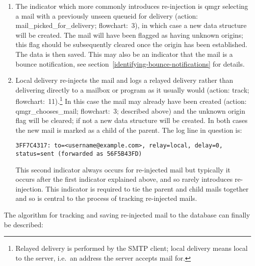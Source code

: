 \documentclass[a4paper,12pt,draft]{article}
\begin{document}
\begin{enumerate}

    \item The indicator which more commonly introduces re-injection is qmgr
        selecting a mail with a previously unseen queueid for delivery
        (action: mail\_picked\_for\_delivery; flowchart:~3), in which case
        a new data structure will be created.  The mail will have been
        flagged as having unknown origins; this flag should be subsequently
        cleared once the origin has been established.  The data is then
        saved.  This may also be an indicator that the mail is a bounce
        notification, see section~\ref{identifying-bounce-notifications}
        for details.

    \item Local delivery re-injects the mail and logs a relayed delivery
        rather than delivering directly to a mailbox or program as it
        usually would (action: track; flowchart:~11).\footnote{Relayed
        delivery is performed by the SMTP client; local delivery means
        local to the server, i.e.\ an address the server accepts mail for.}
        In this case the mail may already have been created (action:
        qmgr\_chooses\_mail; flowchart:~3; described above) and the unknown
        origin flag will be cleared; if not a new data structure will be
        created.  In both cases the new mail is marked as a child of the
        parent.  The log line in question is:

        \texttt{3FF7C4317: to=<username@example.com>, relay=local, \newline 
        delay=0, status=sent (forwarded as 56F5B43FD)}

        This second indicator always occurs for re-injected mail but
        typically it occurs after the first indicator explained above, and
        so rarely introduces re-injection.  This indicator is required to
        tie the parent and child mails together and so is central to the
        process of tracking re-injected mails.

\end{enumerate}

The algorithm for tracking and saving re-injected mail to the database can
finally be described:
\end{document}
